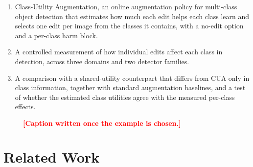 \documentclass[conference]{IEEEtran}
\newcommand{\todo}[1]{\textcolor{red}{\textbf{[#1]}}}
\begin{document}
\begin{enumerate}
    \item Class-Utility Augmentation, an online augmentation policy for multi-class object detection that estimates how much each edit helps each class learn and selects one edit per image from the classes it contains, with a no-edit option and a per-class harm block.
    \item A controlled measurement of how individual edits affect each class in detection, across three domains and two detector families.
    \item A comparison with a shared-utility counterpart that differs from CUA only in class information, together with standard augmentation baselines, and a test of whether the estimated class utilities agree with the measured per-class effects.
\end{enumerate}

\begin{figure}[t]
\centering
{}
\caption[Teaser]{\todo{Caption written once the example is chosen.}}
\label{fig:teaser}
\end{figure}

\section{Related Work}
\label{sec:related}
\end{document}
